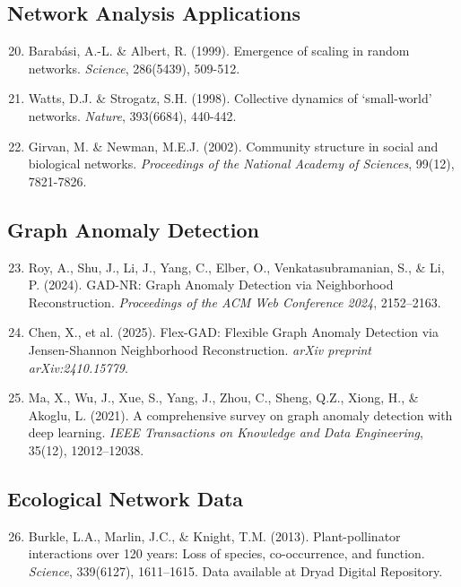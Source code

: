 \documentclass[12pt,a4paper]{article}
\theoremstyle{definition}
\theoremstyle{remark}
\begin{document}
\subsection*{Network Analysis Applications}

\begin{enumerate}
    \setcounter{enumi}{19}
    \item Barabási, A.-L. \& Albert, R. (1999). Emergence of scaling in random networks. \textit{Science}, 286(5439), 509-512.
    
    \item Watts, D.J. \& Strogatz, S.H. (1998). Collective dynamics of `small-world' networks. \textit{Nature}, 393(6684), 440-442.
    
    \item Girvan, M. \& Newman, M.E.J. (2002). Community structure in social and biological networks. \textit{Proceedings of the National Academy of Sciences}, 99(12), 7821-7826.
\end{enumerate}

\subsection*{Graph Anomaly Detection}

\begin{enumerate}
    \setcounter{enumi}{22}
    \item Roy, A., Shu, J., Li, J., Yang, C., Elber, O., Venkatasubramanian, S., \& Li, P. (2024). GAD-NR: Graph Anomaly Detection via Neighborhood Reconstruction. \textit{Proceedings of the ACM Web Conference 2024}, 2152--2163.
    
    \item Chen, X., et al. (2025). Flex-GAD: Flexible Graph Anomaly Detection via Jensen-Shannon Neighborhood Reconstruction. \textit{arXiv preprint arXiv:2410.15779}.
    
    \item Ma, X., Wu, J., Xue, S., Yang, J., Zhou, C., Sheng, Q.Z., Xiong, H., \& Akoglu, L. (2021). A comprehensive survey on graph anomaly detection with deep learning. \textit{IEEE Transactions on Knowledge and Data Engineering}, 35(12), 12012--12038.
\end{enumerate}

\subsection*{Ecological Network Data}

\begin{enumerate}
    \setcounter{enumi}{25}
    \item Burkle, L.A., Marlin, J.C., \& Knight, T.M. (2013). Plant-pollinator interactions over 120 years: Loss of species, co-occurrence, and function. \textit{Science}, 339(6127), 1611--1615. Data available at Dryad Digital Repository.
\end{enumerate}
\end{document}
